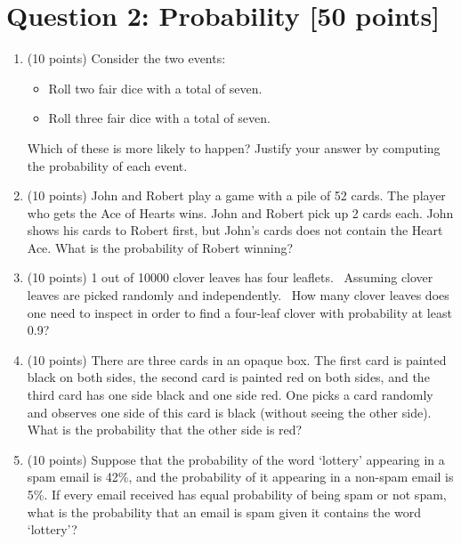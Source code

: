 \documentclass{article}
\begin{document}
\section*{Question 2: Probability [50 points]}
\begin{enumerate}

\item (10 points) Consider the two events:

\begin{itemize}
	\item Roll two fair dice with a total of seven.
	\item Roll three fair dice with a total of seven.
\end{itemize}

Which of these is more likely to happen? Justify your answer by computing the probability of each event.

\item (10 points) John and Robert play a game with a pile of 52 cards. The player who gets the Ace of Hearts wins. John and Robert pick up 2 cards each. John shows his cards to Robert first, but John’s cards does not contain the Heart Ace. What is the probability of Robert winning? 

\item (10 points) 1 out of 10000 clover leaves has four leaflets.  Assuming clover leaves are picked randomly and independently.  How many clover leaves does one need to inspect in order to find a four-leaf clover with probability at least 0.9?

\item (10 points) There are three cards in an opaque box. The first card is painted black on both sides, the second card is painted red on both sides, and the third card has one side black and one side red. One picks a card randomly and observes one side of this card is black (without seeing the other side). What is the probability that the other side is red?

\item (10 points)  Suppose that the probability of the word ‘lottery’ appearing in a spam email is 42\%, and the probability of it appearing in a non-spam email is 5\%. If every email received has equal probability of being spam or not spam, what is the probability that an email is spam given it contains the word ‘lottery’?


\end{enumerate}
\end{document}
